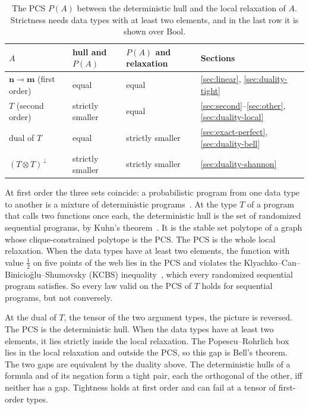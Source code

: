 \begin{table}[t]
\centering
\caption{The PCS $P(A)$ between the deterministic hull and the
local relaxation of $A$. Strictness needs data types with at least two
elements, and in the last row it is shown over $\mathrm{Bool}$.}
\label{tab:sandwich}
\begin{tabular}{@{}llll@{}}
\toprule
$A$ & hull and $P(A)$ & $P(A)$ and relaxation & Sections \\
\midrule
$\mathbf{n} \multimap \mathbf{m}$ (first order) & equal & equal & \ref{sec:linear}, \ref{sec:duality-tight} \\
$T$ (second order) & strictly smaller & equal & \ref{sec:second}--\ref{sec:other}, \ref{sec:duality-local} \\
dual of $T$ & equal & strictly smaller & \ref{sec:exact-perfect}, \ref{sec:duality-bell} \\
$(T \otimes T)^{\perp}$ & strictly smaller & strictly smaller & \ref{sec:duality-shannon} \\
\bottomrule
\end{tabular}
\end{table}

At first order the three sets coincide: a probabilistic program from one
data type to another is a mixture of deterministic
programs~\cite{levin-peres-wilmer2009}. At the type
$T$ of a program that calls two functions once each, the deterministic
hull is the set of randomized sequential programs, by Kuhn's
theorem~\cite{kuhn1953}. It is the stable set polytope of a graph whose
clique-constrained polytope is the PCS. The PCS
is the whole local relaxation. When the data types have at least two
elements, the function with value $\tfrac12$ on five points of the web lies in the PCS and violates the
Klyachko--Can--Binicio\u{g}lu--Shumovsky (KCBS)
inequality~\cite{klyachko2008}, which every randomized sequential program
satisfies. So every law valid on the PCS of $T$ holds for
sequential programs, but not conversely.

At the dual of $T$, the tensor of the two argument types, the picture is
reversed. The PCS is the deterministic hull. When the data types have
at least two elements, it lies strictly inside the local relaxation. The Popescu--Rohrlich
box~\cite{popescu-rohrlich1994} lies in the local relaxation and outside
the PCS, so this gap is Bell's theorem. The two gaps are equivalent by the duality above. The deterministic hulls of a formula
and of its negation form a tight pair, each the orthogonal of the other,
iff neither has a gap. Tightness holds at first order and can fail at a tensor of first-order
types.

